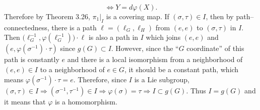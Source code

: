 \begin{enumerate}
\[\Leftrightarrow Y=d \varphi(X).\]
Therefore by Theorem 3.26, $\pi_{1}|_{I}$ is a covering map. 
If $(\sigma, \tau) \in I$, then by path--connectedness, 
there is a path $\ell=(\ell_{G}, \ell_{H})$ from $(e, e)$ to $(\sigma, \tau)$ in $I$. 
Then $\big(\ell_{G}^{-1}, \varphi(\ell_{G}^{-1})\big) \cdot \ell$ is also a path in $I$ which joins $(e, e)$ and $(e, \varphi(\sigma^{-1}) \cdot \tau)$ since $g(G) \subset I$. 
However, since the ``$G$ coordinate'' of this path is constantly $e$ and there is a local isomorphism from a neighborhood of $(e, e) \in I$ to a neighborhood of $e \in G$, 
it should be a constant path, which means $\varphi(\sigma^{-1}) \cdot \tau=e$. 
Therefore, since $I$ is a Lie subgroup, $(\sigma, \tau) \in I \Rightarrow (\sigma^{-1}, \tau^{-1}) \in I \Rightarrow \varphi(\sigma)=\tau \Rightarrow I \subset g(G)$. 
Thus $I=g(G)$ and it means that $\varphi$ is a homomorphism.


\end{enumerate}
